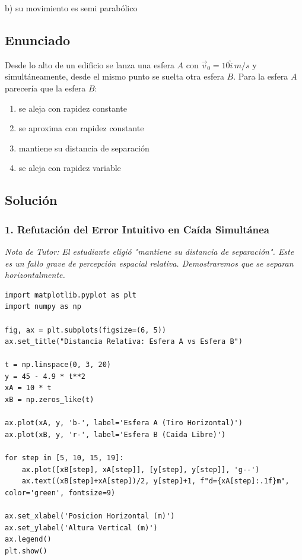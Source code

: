 \documentclass[12pt, a4paper]{article}
\begin{document}
\begin{tcolorbox}[colback=green!5!white, colframe=green!50!black, title=Respuesta Final]
\centering \Large b) su movimiento es semi parabólico
\end{tcolorbox}

\newpage

\subsection*{Enunciado}
Desde lo alto de un edificio se lanza una esfera $A$ con $\vec{v}_0 = 10\hat{i} \,\si{m/s}$ y simultáneamente, desde el mismo punto se suelta otra esfera $B$. Para la esfera $A$ parecería que la esfera $B$:
\begin{enumerate}[label=\alph*)]
    \item se aleja con rapidez constante
    \item se aproxima con rapidez constante
    \item mantiene su distancia de separación
    \item se aleja con rapidez variable
\end{enumerate}

\subsection*{Solución}

\subsubsection*{1. Refutación del Error Intuitivo en Caída Simultánea}
\textit{Nota de Tutor: El estudiante eligió "mantiene su distancia de separación". Este es un fallo grave de percepción espacial relativa. Demostraremos que se separan horizontalmente.}

\begin{verbatim}
import matplotlib.pyplot as plt
import numpy as np

fig, ax = plt.subplots(figsize=(6, 5))
ax.set_title("Distancia Relativa: Esfera A vs Esfera B")

t = np.linspace(0, 3, 20)
y = 45 - 4.9 * t**2
xA = 10 * t
xB = np.zeros_like(t)

ax.plot(xA, y, 'b-', label='Esfera A (Tiro Horizontal)')
ax.plot(xB, y, 'r-', label='Esfera B (Caida Libre)')

for step in [5, 10, 15, 19]:
    ax.plot([xB[step], xA[step]], [y[step], y[step]], 'g--')
    ax.text((xB[step]+xA[step])/2, y[step]+1, f"d={xA[step]:.1f}m", color='green', fontsize=9)

ax.set_xlabel('Posicion Horizontal (m)')
ax.set_ylabel('Altura Vertical (m)')
ax.legend()
plt.show()
\end{verbatim}
\end{document}
